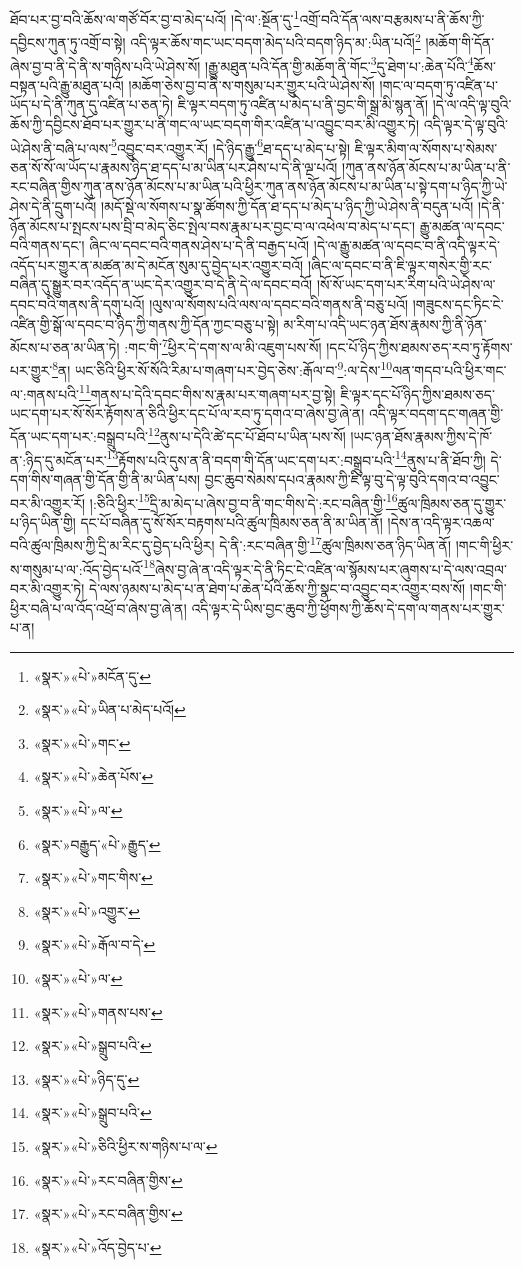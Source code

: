 ཐོབ་པར་བྱ་བའི་ཆོས་ལ་གཙོ་བོར་བྱ་བ་མེད་པའོ། །དེ་ལ་:སྔོན་དུ་\footnote{«སྣར་»«པེ་»མངོན་དུ་}འགྲོ་བའི་དོན་ལས་བརྩམས་པ་ནི་ཆོས་ཀྱི་དབྱིངས་ཀུན་ཏུ་འགྲོ་བ་སྟེ། འདི་ལྟར་ཆོས་གང་ཡང་བདག་མེད་པའི་བདག་ཉིད་མ་:ཡིན་པའོ།\footnote{«སྣར་»«པེ་»ཡིན་པ་མེད་པའོ།} །མཆོག་གི་དོན་ཞེས་བྱ་བ་ནི་དེ་ནི་ས་གཉིས་པའི་ཡེ་ཤེས་སོ། །རྒྱུ་མཐུན་པའི་དོན་གྱི་མཆོག་ནི་གོང་\footnote{«སྣར་»«པེ་»གང་}དུ་ཐེག་པ་:ཆེན་པོའི་\footnote{«སྣར་»«པེ་»ཆེན་པོས་}ཆོས་བསྟན་པའི་རྒྱུ་མཐུན་པའོ། །མཆོག་ཅེས་བྱ་བ་ནི་ས་གསུམ་པར་གྱུར་པའི་ཡེ་ཤེས་སོ། །གང་ལ་བདག་ཏུ་འཛིན་པ་ཡོད་པ་དེ་ནི་ཀུན་དུ་འཛིན་པ་ཅན་ཏེ། ཇི་ལྟར་བདག་ཏུ་འཛིན་པ་མེད་པ་ནི་བྱང་གི་སྒྲ་མི་སྙན་ནོ། །དེ་ལ་འདི་ལྟ་བུའི་ཆོས་ཀྱི་དབྱིངས་ཐོབ་པར་གྱུར་པ་ནི་གང་ལ་ཡང་བདག་གིར་འཛིན་པ་འབྱུང་བར་མི་འགྱུར་ཏེ། འདི་ལྟར་དེ་ལྟ་བུའི་ཡེ་ཤེས་ནི་བཞི་པ་ལས་\footnote{«སྣར་»«པེ་»ལ་}འབྱུང་བར་འགྱུར་རོ། །དེ་ཉིད་རྒྱུ་\footnote{«སྣར་»བརྒྱུད་«པེ་»རྒྱུད་}ཐ་དད་པ་མེད་པ་སྟེ། ཇི་ལྟར་མིག་ལ་སོགས་པ་སེམས་ཅན་སོ་སོ་ལ་ཡོད་པ་རྣམས་ཉིད་ཐ་དད་པ་མ་ཡིན་པར་ཤེས་པ་དེ་ནི་ལྔ་པའོ། །ཀུན་ནས་ཉོན་མོངས་པ་མ་ཡིན་པ་ནི་རང་བཞིན་གྱིས་ཀུན་ནས་ཉོན་མོངས་པ་མ་ཡིན་པའི་ཕྱིར་ཀུན་ནས་ཉོན་མོངས་པ་མ་ཡིན་པ་སྟེ་དག་པ་ཉིད་ཀྱི་ཡེ་ཤེས་དེ་ནི་དྲུག་པའོ། །མདོ་སྡེ་ལ་སོགས་པ་སྣ་ཚོགས་ཀྱི་དོན་ཐ་དད་པ་མེད་པ་ཉིད་ཀྱི་ཡེ་ཤེས་ནི་བདུན་པའོ། །དེ་ནི་ཉོན་མོངས་པ་སྤངས་པས་བྲི་བ་མེད་ཅིང་སྤེལ་བས་རྣམ་པར་བྱང་བ་ལ་འཕེལ་བ་མེད་པ་དང་། རྒྱུ་མཚན་ལ་དབང་བའི་གནས་དང་། ཞིང་ལ་དབང་བའི་གནས་ཤེས་པ་དེ་ནི་བརྒྱད་པའོ། །དེ་ལ་རྒྱུ་མཚན་ལ་དབང་བ་ནི་འདི་ལྟར་དེ་འདོད་པར་གྱུར་ན་མཚན་མ་དེ་མངོན་སུམ་དུ་བྱེད་པར་འགྱུར་བའོ། །ཞིང་ལ་དབང་བ་ནི་ཇི་ལྟར་གསེར་གྱི་རང་བཞིན་དུ་སྒྱུར་བར་འདོད་ན་ཡང་དེར་འགྱུར་བ་དེ་ནི་དེ་ལ་དབང་བའོ། །སོ་སོ་ཡང་དག་པར་རིག་པའི་ཡེ་ཤེས་ལ་དབང་བའི་གནས་ནི་དགུ་པའོ། །ལུས་ལ་སོགས་པའི་ལས་ལ་དབང་བའི་གནས་ནི་བཅུ་པའོ། །གཟུངས་དང་ཏིང་ངེ་འཛིན་གྱི་སྒོ་ལ་དབང་བ་ཉིད་ཀྱི་གནས་ཀྱི་དོན་ཀྱང་བཅུ་པ་སྟེ། མ་རིག་པ་འདི་ཡང་ཉན་ཐོས་རྣམས་ཀྱི་ནི་ཉོན་མོངས་པ་ཅན་མ་ཡིན་ཏེ། :གང་གི་\footnote{«སྣར་»«པེ་»གང་གིས་}ཕྱིར་དེ་དག་ས་ལ་མི་འཇུག་པས་སོ། །དང་པོ་ཉིད་ཀྱིས་ཐམས་ཅད་རབ་ཏུ་རྟོགས་པར་གྱུར་\footnote{«སྣར་»«པེ་»འགྱུར་}ན། ཡང་ཅིའི་ཕྱིར་སོ་སོའི་རིམ་པ་གཞག་པར་བྱེད་ཅེས་:རྒོལ་བ་\footnote{«སྣར་»«པེ་»རྒོལ་བ་དེ་}:ལ་དེས་\footnote{«སྣར་»«པེ་»ལ་}ལན་གདབ་པའི་ཕྱིར་གང་ལ་:གནས་པའི་\footnote{«སྣར་»«པེ་»གནས་པས་}གནས་པ་དེའི་དབང་གིས་ས་རྣམ་པར་གཞག་པར་བྱ་སྟེ། ཇི་ལྟར་དང་པོ་ཉིད་ཀྱིས་ཐམས་ཅད་ཡང་དག་པར་སོ་སོར་རྟོགས་ན་ཅིའི་ཕྱིར་དང་པོ་ལ་རབ་ཏུ་དགའ་བ་ཞེས་བྱ་ཞེ་ན། འདི་ལྟར་བདག་དང་གཞན་གྱི་དོན་ཡང་དག་པར་:བསྒྲུབ་པའི་\footnote{«སྣར་»«པེ་»སྒྲུབ་པའི་}ནུས་པ་དེའི་ཚེ་དང་པོ་ཐོབ་པ་ཡིན་པས་སོ། །ཡང་ཉན་ཐོས་རྣམས་ཀྱིས་དེ་ཁོ་ན་:ཉིད་དུ་མངོན་པར་\footnote{«སྣར་»«པེ་»ཉིད་དུ་}རྟོགས་པའི་དུས་ན་ནི་བདག་གི་དོན་ཡང་དག་པར་:བསྒྲུབ་པའི་\footnote{«སྣར་»«པེ་»སྒྲུབ་པའི་}ནུས་པ་ནི་ཐོབ་ཀྱི། དེ་དག་གིས་གཞན་གྱི་དོན་གྱི་ནི་མ་ཡིན་པས། བྱང་ཆུབ་སེམས་དཔའ་རྣམས་ཀྱི་ཇི་ལྟ་བུ་དེ་ལྟ་བུའི་དགའ་བ་འབྱུང་བར་མི་འགྱུར་རོ། །:ཅིའི་ཕྱིར་\footnote{«སྣར་»«པེ་»ཅིའི་ཕྱིར་ས་གཉིས་པ་ལ་}དྲི་མ་མེད་པ་ཞེས་བྱ་བ་ནི་གང་གིས་དེ་:རང་བཞིན་གྱི་\footnote{«སྣར་»«པེ་»རང་བཞིན་གྱིས་}ཚུལ་ཁྲིམས་ཅན་དུ་གྱུར་པ་ཉིད་ཡིན་གྱི། དང་པོ་བཞིན་དུ་སོ་སོར་བརྟགས་པའི་ཚུལ་ཁྲིམས་ཅན་ནི་མ་ཡིན་ནོ། །དེས་ན་འདི་ལྟར་འཆལ་བའི་ཚུལ་ཁྲིམས་ཀྱི་དྲི་མ་རིང་དུ་བྱེད་པའི་ཕྱིར། དེ་ནི་:རང་བཞིན་གྱི་\footnote{«སྣར་»«པེ་»རང་བཞིན་གྱིས་}ཚུལ་ཁྲིམས་ཅན་ཉིད་ཡིན་ནོ། །གང་གི་ཕྱིར་ས་གསུམ་པ་ལ་:འོད་བྱེད་པའོ་\footnote{«སྣར་»«པེ་»འོད་བྱེད་པ་}ཞེས་བྱ་ཞེ་ན་འདི་ལྟར་དེ་ནི་ཏིང་ངེ་འཛིན་ལ་སྙོམས་པར་ཞུགས་པ་དེ་ལས་འབྲལ་བར་མི་འགྱུར་ཏེ། དེ་ལས་ཉམས་པ་མེད་པ་ན་ཐེག་པ་ཆེན་པོའི་ཆོས་ཀྱི་སྣང་བ་འབྱུང་བར་འགྱུར་བས་སོ། །གང་གི་ཕྱིར་བཞི་པ་ལ་འོད་འཕྲོ་བ་ཞེས་བྱ་ཞེ་ན། འདི་ལྟར་དེ་ཡིས་བྱང་ཆུབ་ཀྱི་ཕྱོགས་ཀྱི་ཆོས་དེ་དག་ལ་གནས་པར་གྱུར་པ་ན། 